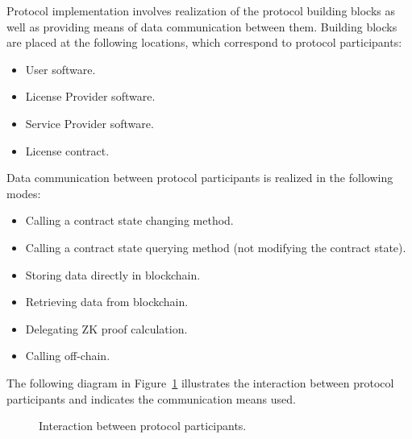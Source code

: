 
Protocol implementation involves realization of the protocol building blocks as well as providing means of data communication between them. Building blocks are placed at the following locations, which correspond to protocol participants:

\begin{itemize}%
	\item User software.
	\item License Provider software.
	\item Service Provider software.
	\item License contract.
\end{itemize}

\begin{flushleft}
	Data communication between protocol participants is realized in the following modes:
\end{flushleft}

\begin{itemize}%
	\item Calling a contract state changing method.
	\item Calling a contract state querying method (not modifying the contract state).
	\item Storing data directly in blockchain.
	\item Retrieving data from blockchain.
	\item Delegating ZK proof calculation.
	\item Calling off-chain.
\end{itemize}

\begin{flushleft}
	The following diagram in Figure~\ref{fig:implementation} illustrates the interaction between protocol participants and indicates the communication means used.
\end{flushleft}

\begin{figure}[h!]
	\centering
	\caption{Interaction between protocol participants.}
	\label{fig:implementation}
\end{figure}

